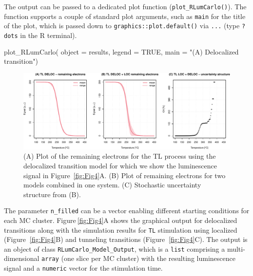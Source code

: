 The output can be passed to a dedicated plot function
(\texttt{plot\_RLumCarlo()}). The function supports a couple of standard
plot arguments, such as \texttt{main} for the title of the plot, which
is passed down to \texttt{graphics::plot.default()} via \texttt{...}
(type \texttt{?dots} in the R terminal).

\begin{Schunk}
\begin{Sinput}
plot_RLumCarlo(
  object = results,
  legend = TRUE, 
  main = "(A) Delocalized transition")
\end{Sinput}
\end{Schunk}

\begin{Schunk}
\begin{figure}

{\centering \includegraphics[width=140mm]{figures/Fig5-1} 

}

\caption{(A) Plot of the remaining electrons for the TL process using the delocalized transition model for which we show the luminescence signal in Figure~\ref{fig:Fig4}A. (B) Plot of remaining electrons for two models combined in one system. (C) Stochastic uncertainty structure from (B).}\label{fig:Fig5}
\end{figure}
\end{Schunk}

The parameter \texttt{n\_filled} can be a vector enabling different
starting conditions for each MC cluster. Figure\(~\)\ref{fig:Fig4}A
shows the graphical output for delocalized transitions along with the
simulation results for \texttt{TL} stimulation using localized
(Figure\(~\) \ref{fig:Fig4}B) and tunneling transitions (Figure\(~\)
\ref{fig:Fig4}C). The output is an object of class
\texttt{RLumCarlo\_Model\_Output}, which is a \texttt{list} comprising a
multi-dimensional \texttt{array} (one slice per MC cluster) with the
resulting luminescence signal and a \texttt{numeric} vector for the
stimulation time.


